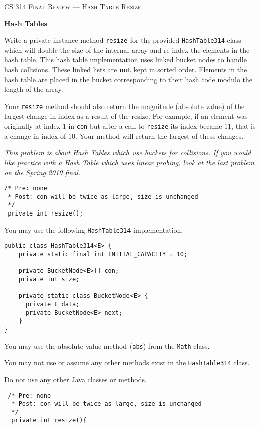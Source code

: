 \documentclass[12pt,letter]{article}
\begin{document}
\noindent\textsc{\large CS 314 Final Review --- Hash Table Resize}

\vspace{6pt}
\noindent\textbf{Hash Tables}

\vspace{2pt}
\noindent Write a private instance method \texttt{resize} for the provided \texttt{HashTable314} class which will double the size of the internal
array and re-index the elements in the hash table. This hash table implementation uses linked bucket nodes to handle hash collisions. 
These linked lists are \textbf{not} kept in sorted order. Elements in the hash table are placed in the bucket corresponding to their 
hash code modulo the length of the array.

\vspace{4pt}
\noindent Your \texttt{resize} method should also return the magnitude (absolute value) of the largest change in index as a result of the resize.
For example, if an element was originally at index $1$ in \texttt{con} but after a call to \texttt{resize} its index became $11$, that is a 
change in index of $10$. Your method will return the largest of these changes.

\vspace{4pt}
\noindent \emph{This problem is about Hash Tables which use buckets for collisions. If you would like practice with a Hash Table which uses linear probing, 
look at the last problem on the Spring 2019 final.}

\vspace{4pt}

\begin{verbatim}
/* Pre: none
 * Post: con will be twice as large, size is unchanged
 */
 private int resize();
\end{verbatim}

\vspace{6pt}
\noindent You may use the following \texttt{HashTable314} implementation.
\begin{verbatim}
public class HashTable314<E> {
    private static final int INITIAL_CAPACITY = 10;

    private BucketNode<E>[] con;
    private int size;

    private static class BucketNode<E> {
      private E data;
      private BucketNode<E> next;
    }
}
\end{verbatim}


\noindent You may use the absolute value method (\texttt{abs}) from the \texttt{Math} class.

\noindent You may not use or assume any other methods exist in the \texttt{HashTable314} class.

\noindent Do not use any other Java classes or methods.

\clearpage
\begin{verbatim}
 /* Pre: none
  * Post: con will be twice as large, size is unchanged
  */
  private int resize(){
 \end{verbatim}
\end{document}
